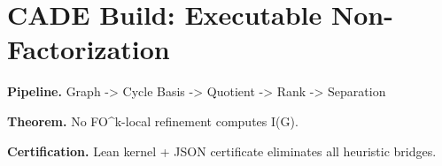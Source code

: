 \section*{CADE Build: Executable Non-Factorization}

\textbf{Pipeline.}
Graph -> Cycle Basis -> Quotient -> Rank -> Separation

\textbf{Theorem.}
No FO^k-local refinement computes I(G).

\textbf{Certification.}
Lean kernel + JSON certificate eliminates all heuristic bridges.
